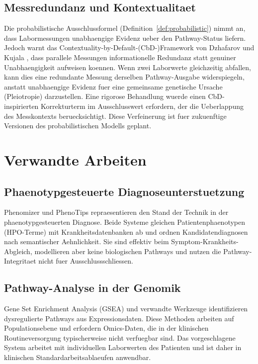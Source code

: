 \documentclass[12pt,a4paper]{article}
\begin{document}
\subsection{Messredundanz und Kontextualitaet}

Die probabilistische Ausschlussformel (Definition~\ref{def:probabilistic}) nimmt an, dass Labormessungen unabhaengige Evidenz ueber den Pathway-Status liefern. Jedoch warnt das Contextuality-by-Default-(CbD-)Framework von Dzhafarov und Kujala \citep{Dzhafarov2016}, dass parallele Messungen informationelle Redundanz statt genuiner Unabhaengigkeit aufweisen koennen. Wenn zwei Laborwerte gleichzeitig abfallen, kann dies eine redundante Messung derselben Pathway-Ausgabe widerspiegeln, anstatt unabhaengige Evidenz fuer eine gemeinsame genetische Ursache (Pleiotropie) darzustellen. Eine rigorose Behandlung wuerde einen CbD-inspirierten Korrekturterm im Ausschlusswert erfordern, der die Ueberlappung des Messkontexts beruecksichtigt. Diese Verfeinerung ist fuer zukuenftige Versionen des probabilistischen Modells geplant.

\section{Verwandte Arbeiten}
\label{sec:related}

\subsection{Phaenotypgesteuerte Diagnoseunterstuetzung}

Phenomizer \citep{Kohler2009} und PhenoTips \citep{Girdea2013} repraesentieren den Stand der Technik in der phaenotypgesteuerten Diagnose. Beide Systeme gleichen Patientenphaenotypen (HPO-Terme) mit Krankheitsdatenbanken ab und ordnen Kandidatendiagnosen nach semantischer Aehnlichkeit. Sie sind effektiv beim Symptom-Krankheits-Abgleich, modellieren aber keine biologischen Pathways und nutzen die Pathway-Integritaet nicht fuer Ausschlussschliessen.

\subsection{Pathway-Analyse in der Genomik}

Gene Set Enrichment Analysis (GSEA) \citep{Subramanian2005} und verwandte Werkzeuge identifizieren dysregulierte Pathways aus Expressionsdaten. Diese Methoden arbeiten auf Populationsebene und erfordern Omics-Daten, die in der klinischen Routineversorgung typischerweise nicht verfuegbar sind. Das vorgeschlagene System arbeitet mit individuellen Laborwerten des Patienten und ist daher in klinischen Standardarbeitsablaeufen anwendbar.
\end{document}
